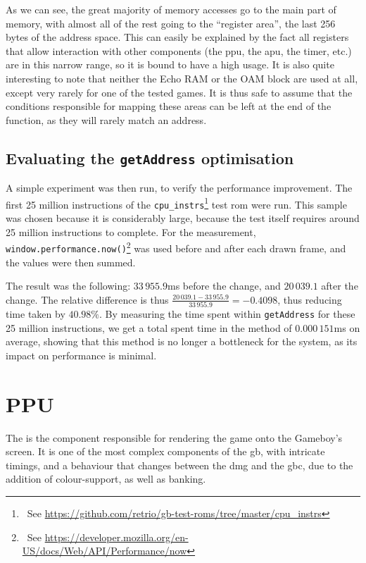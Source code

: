 \documentclass[11pt]{report}
\newcommand{\ftnt}[1]{\footnote{~See \url{#1}}}
\begin{document}
As we can see, the great majority of memory accesses go to the main part of memory, with almost all of the rest going to the ``register area'', the last 256 bytes of the address space. This can easily be explained by the fact all registers that allow interaction with other components (the \gls{ppu}, the \gls{apu}, the timer, etc.) are in this narrow range, so it is bound to have a high usage. It is also quite interesting to note that neither the Echo RAM or the OAM block are used at all, except very rarely for one of the tested games. It is thus safe to assume that the conditions responsible for mapping these areas can be left at the end of the function, as they will rarely match an address.

\subsection{Evaluating the \texttt{getAddress} optimisation}

A simple experiment was then run, to verify the performance improvement. The first 25 million instructions of the \texttt{cpu\_instrs}\ftnt{https://github.com/retrio/gb-test-roms/tree/master/cpu_instrs} test \gls{rom} were run. This sample was chosen because it is considerably large, because the test itself requires around 25 million instructions to complete. For the measurement, \texttt{window.performance.now()}\ftnt{https://developer.mozilla.org/en-US/docs/Web/API/Performance/now} was used before and after each drawn frame, and the values were then summed.

The result was the following: $33\,955.9$ms before the change, and $20\,039.1$ after the change. The relative difference is thus $\frac{20\,039.1-33\,955.9}{33\,955.9}=-0.4098$, thus reducing time taken by $40.98\%$. By measuring the time spent within \texttt{getAddress} for these 25 million instructions, we get a total spent time in the method of $0.000\,151$ms on average, showing that this method is no longer a bottleneck for the system, as its impact on performance is minimal.

\section{PPU}

The  is the component responsible for rendering the game onto the Gameboy's screen. It is one of the most complex components of the \gls{gb}, with intricate timings, and a behaviour that changes between the \gls{dmg} and the \gls{gbc}, due to the addition of colour-support, as well as  banking.
\end{document}
